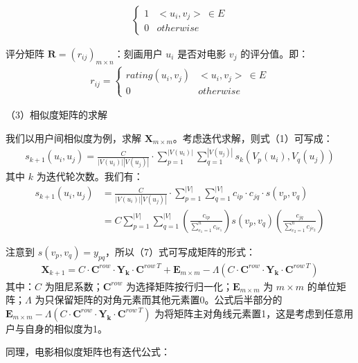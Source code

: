 \begin{spacing}{1.5}
{\begin{align}
\begin{cases}
1 &<u_i,v_j>\ \in E \\
0 &otherwise
\end{cases}
\end{align}
}\par
评分矩阵 $\mathbf{R}=(r_{ij})_{m\times n}$：刻画用户 $u_i$ 是否对电影 $v_j$ 的评分值。即：
{\setlength\abovedisplayskip{1pt}
\setlength\belowdisplayskip{1pt}
\begin{align}
r_{ij} = 
\begin{cases}
rating(u_i,v_j) &<u_i,v_j>\ \in E \\
0 &otherwise
\end{cases}
\end{align}
}\par
（3）相似度矩阵的求解\par
我们以用户间相似度为例，求解 $\mathbf{X}_{m\times m}$。考虑迭代求解，则式（1）可写成：
{\setlength\abovedisplayskip{1pt}
\setlength\belowdisplayskip{1pt}
\begin{align}
s_{k+1}(u_i,u_j)=\frac{C}{|V(u_i)||V(u_j)|}\cdot \sum_{p=1}^{|V(u_i)|}\sum_{q=1}^{|V(u_j)|} {s_k(V_p(u_i),V_q(u_j))}
\end{align}
}
其中 $k$ 为迭代轮次数。我们有：
{\setlength\abovedisplayskip{1pt}
\setlength\belowdisplayskip{1pt}
\begin{align}
s_{k+1}(u_i,u_j)&=\frac{C}{|V(u_i)||V(u_j)|}\cdot \sum_{p=1}^{|V|}\sum_{q=1}^{|V|} {c_{ip}\cdot c_{jq}\cdot s(v_p,v_q)}\\
&=C\sum_{p=1}^{|V|}\sum_{q=1}^{|V|}(\frac{c_{ip}}{\sum_{e_1=1}^{n}c_{ie_1}})s(v_p,v_q)(\frac{c_{jq}}{\sum_{e_2=1}^n c_{je_2}})
\end{align}
}\par
注意到 $s(v_p,v_q)=y_{pq}$，所以（7）式可写成矩阵的形式：
{\setlength\abovedisplayskip{1pt}
\setlength\belowdisplayskip{1pt}
\begin{align}
\mathbf{X}_{k+1} = C\cdot\mathbf{C}^{row}\cdot \mathbf{Y_k} \cdot \mathbf{C}^{row\ T}+ \mathbf{E}_{m\times m} - \Lambda ({C\cdot\mathbf{C}^{row}\cdot \mathbf{Y_k} \cdot \mathbf{C}^{row\ T}})
\end{align}
}
其中：$C$ 为阻尼系数；$\mathbf{C}^{row}$ 为选择矩阵按行归一化；$\mathbf{E}_{m\times m}$ 为 $m\times m$ 的单位矩阵；$\Lambda$ 为只保留矩阵的对角元素而其他元素置0。公式后半部分的 $\mathbf{E}_{m\times m} - \Lambda ({C\cdot\mathbf{C}^{row}\cdot \mathbf{Y_k} \cdot \mathbf{C}^{row\ T}})$ 为将矩阵主对角线元素置1，这是考虑到任意用户与自身的相似度为1。\par
同理，电影相似度矩阵也有迭代公式：
{\setlength\abovedisplayskip{1pt}
}
\end{spacing}
